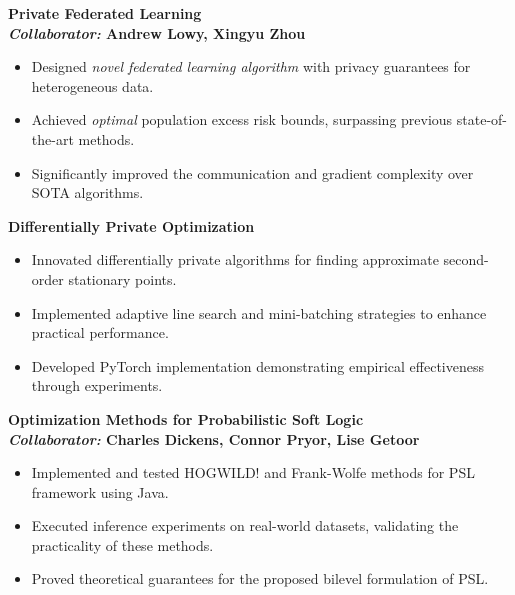 \documentclass[letterpaper,12pt]{article}
\newcommand{\resumeSubheadingTitleOnly}[1]{
  \vspace{-1pt}
\item
  \textbf{#1}
  \vspace{-5pt}
}
\begin{document}
\resumeSubheadingTitleOnly{Private Federated Learning \\
{\normalfont \textit{Collaborator:}} Andrew Lowy, Xingyu Zhou}
\begin{itemize}
  \item Designed \textit{novel federated learning algorithm} with privacy guarantees for heterogeneous data.
  \item Achieved \textit{optimal} population excess risk bounds, surpassing previous state-of-the-art methods.
  \item Significantly improved the communication and gradient complexity over SOTA algorithms.
\end{itemize}

\resumeSubheadingTitleOnly{Differentially Private Optimization}
\begin{itemize}
  \item Innovated differentially private algorithms for finding approximate second-order stationary points.
  \item Implemented adaptive line search and mini-batching strategies to enhance practical performance.
  \item Developed PyTorch implementation demonstrating empirical effectiveness through experiments.
\end{itemize}


\resumeSubheadingTitleOnly{Optimization Methods for Probabilistic Soft Logic \\
{\normalfont \textit{Collaborator:}} Charles Dickens, Connor Pryor, Lise Getoor}
\begin{itemize}
  \item Implemented and tested HOGWILD! and Frank-Wolfe methods for PSL framework using Java.
  \item Executed inference experiments on real-world datasets, validating the practicality of these methods.
  \item Proved theoretical guarantees for the proposed bilevel formulation of PSL.
\end{itemize}
\end{document}

